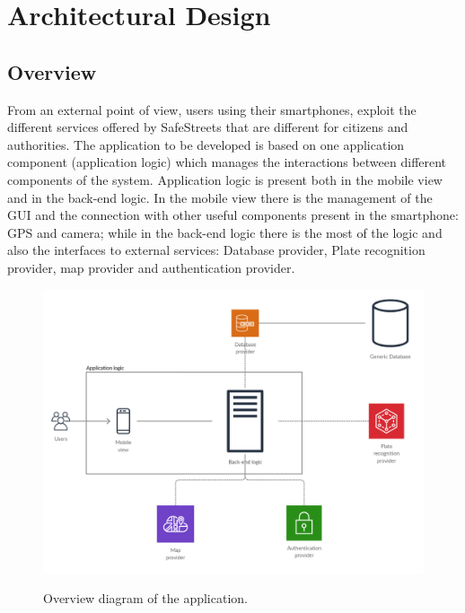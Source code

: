 \documentclass[../RASD.tex]{subfiles}
\begin{document}
    \chapter{Architectural Design}\label{ch:architectural-design}
    \section{Overview}\label{sec:overview}
    From an external point of view, users using their smartphones, exploit the different services offered by SafeStreets that are different for citizens and authorities.
    The application to be developed is based on one application component (application logic) which manages the interactions between different components of the system.
    Application logic is present both in the mobile view and in the back-end logic.
    In the mobile view there is the management of the GUI and the connection with other useful components present in the smartphone: GPS and camera;
    while in the back-end logic there is the most of the logic and also the interfaces to external services:
    Database provider, Plate recognition provider, map provider and authentication provider.
    \begin{figure}[H]
        \centering
        \includegraphics[scale = 1.1]{assets/overview.png}\\[1.6 cm]
        \caption[\textit{OverView} Diagram]{Overview diagram of the application.}
    \end{figure}
\end{document}
